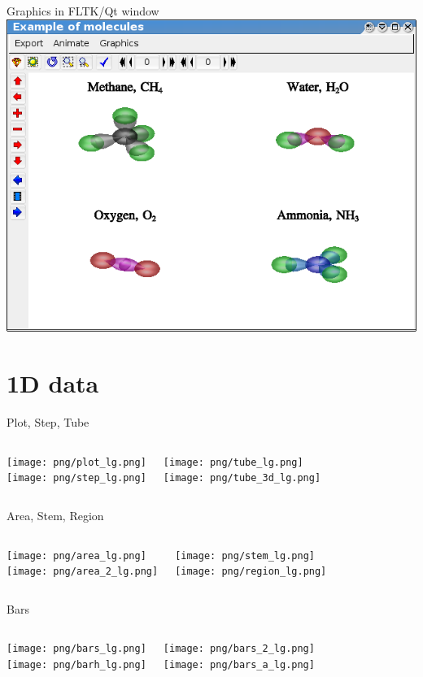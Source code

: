 \documentclass[color=usenames]{beamer}
\begin{document}
\begin{frame}{Graphics in FLTK/Qt window}
\includegraphics[width = 0.9 \textwidth]{fltk.png}
\end{frame}


\section{1D data}

\begin{frame}{Plot, Step, Tube}
\begin{columns}
\texttt{[image: png/plot\_lg.png]}\\
\texttt{[image: png/step\_lg.png]}

\texttt{[image: png/tube\_lg.png]}\\
\texttt{[image: png/tube\_3d\_lg.png]}

\end{columns}
\end{frame}

\begin{frame}{Area, Stem, Region}
\begin{columns}
\texttt{[image: png/area\_lg.png]}\\
\texttt{[image: png/area\_2\_lg.png]}

\texttt{[image: png/stem\_lg.png]}\\
\texttt{[image: png/region\_lg.png]}

\end{columns}
\end{frame}

\begin{frame}{Bars}
\begin{columns}
\texttt{[image: png/bars\_lg.png]}\\
\texttt{[image: png/barh\_lg.png]}

\texttt{[image: png/bars\_2\_lg.png]}\\
\texttt{[image: png/bars\_a\_lg.png]}

\end{columns}
\end{frame}
\end{document}
